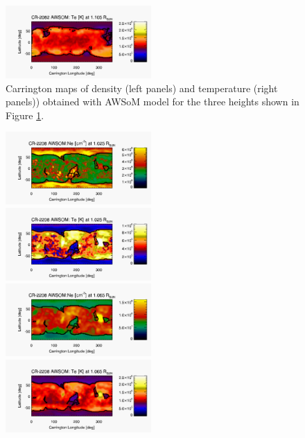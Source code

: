 \documentclass[namedreferences]{solarphysics}
\begin{document}
\begin{article}
\begin{figure}[h!]
\begin{center}
\includegraphics[width=0.495\textwidth]{figs/map_Te_awsom_2082_185_short_1105_Rsun.pdf}
\caption{Carrington maps of density (left panels) and temperature (right panels)) obtained with AWSoM model for the three heights shown in Figure \ref{carmaps_awsom_2082}.}
\label{carmaps_awsom_2082}
\end{center}
\end{figure}

\begin{figure}[h!]
\begin{center}
\includegraphics[width=0.495\textwidth]{figs/map_Ne_awsom_2208_185_short_1025_Rsun.pdf}
\includegraphics[width=0.495\textwidth]{figs/map_Te_awsom_2208_185_short_1025_Rsun.pdf}
\includegraphics[width=0.495\textwidth]{figs/map_Ne_awsom_2208_185_short_1065_Rsun.pdf}
\includegraphics[width=0.495\textwidth]{figs/map_Te_awsom_2208_185_short_1065_Rsun.pdf}

\end{center}
\end{figure}
\end{article}
\end{document}
